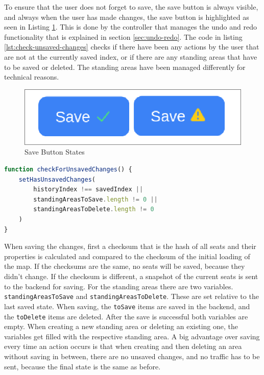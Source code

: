 To ensure that the user does not forget to save, the save button is always visible, and always when the user has made changes, the save button is highlighted as seen in Listing \ref{fig:save-button-states}. This is done by the controller that manages the undo and redo functionality that is explained in section \ref{sec:undo-redo}. The code in listing \ref{lst:check-unsaved-changes} checks if there have been any actions by the user that are not at the currently saved index, or if there are any standing areas that have to be saved or deleted. The standing areas have been managed differently for technical reasons.

\begin{figure}
    \centering
    \includegraphics[scale=0.4]{pics/save-button-states.png}
    \caption{Save Button States}
    \label{fig:save-button-states}
\end{figure}

\begin{lstlisting}[language=TypeScript, caption=Check for Unsaved Changes, label=lst:check-unsaved-changes]
function checkForUnsavedChanges() {
    setHasUnsavedChanges(
        historyIndex !== savedIndex ||
        standingAreasToSave.length != 0 ||
        standingAreasToDelete.length != 0
    )
}
\end{lstlisting}

When saving the changes, first a checksum that is the hash of all seats and their properties is calculated and compared to the checksum of the initial loading of the map. If the checksums are the same, no seats will be saved, because they didn't change. If the checksum is different, a snapshot of the current seats is sent to the backend for saving. For the standing areas there are two variables. \texttt{standingAreasToSave} and \texttt{standingAreasToDelete}. These are set relative to the last saved state. When saving, the \texttt{toSave} items are saved in the backend, and the \texttt{toDelete} items are deleted. After the save is successful both variables are empty. When creating a new standing area or deleting an existing one, the variables get filled with the respective standing area. A big advantage over saving every time an action occurs is that when creating and then deleting an area without saving in between, there are no unsaved changes, and no traffic has to be sent, because the final state is the same as before.
